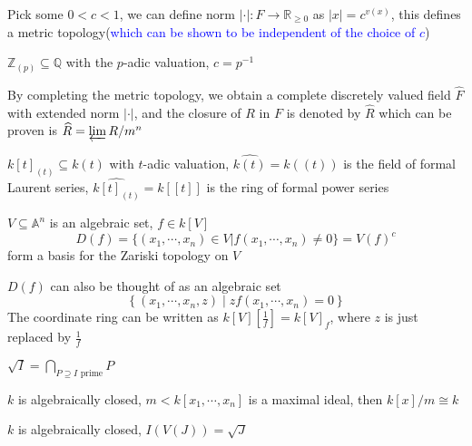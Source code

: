\documentclass[main]{subfiles}
\begin{document}
\begin{definition}
Pick some $0<c<1$, we can define norm $|\cdot|:F\to\mathbb R_{\geq0}$ as $|x|=c^{v(x)}$, this defines a metric topology(\textcolor{blue}{which can be shown to be independent of the choice of $c$})
\end{definition}

\begin{example}
$\mathbb Z_{(p)}\subseteq \mathbb Q$ with the $p$-adic valuation, $c=p^{-1}$
\end{example}

\begin{definition}
By completing the metric topology, we obtain a complete discretely valued field $\widehat F$ with extended norm $|\cdot|$, and the closure of $R$ in $F$ is denoted by $\widehat R$ which can be proven is $\widehat R=\varprojlim R/m^n$
\end{definition}

\begin{example}
$k[t]_{(t)}\subseteq k(t)$ with $t$-adic valuation, $\widehat{k(t)}=k((t))$ is the field of formal Laurent series, $\widehat{k[t]_{(t)}}=k[[t]]$ is the ring of formal power series
\end{example}

\begin{definition}
$V\subseteq\mathbb A^n$ is an algebraic set, $f\in k[V]$
\[D(f)=\{(x_1,\cdots,x_n)\in V|f(x_1,\cdots,x_n)\neq0\}=V(f)^c\]
form a basis for the Zariski topology on $V$ \par
$D(f)$ can also be thought of as an algebraic set
\[\left\{(x_1,\cdots,x_n,z)\middle|zf(x_1,\cdots,x_n)=0\right\}\]
The coordinate ring can be written as $k[V][\frac{1}{f}]=k[V]_f$, where $z$ is just replaced by $\frac{1}{f}$
\end{definition}

\begin{theorem}
$\displaystyle \sqrt{I}=\bigcap_{P\supseteq I \text{ prime}}P$
\end{theorem}

\begin{theorem}\label{Hilbert Nullstellensatz weak form}
$k$ is algebraically closed, $m<k[x_1,\cdots,x_n]$ is a maximal ideal, then $k[x]/m\cong k$
\end{theorem}

\begin{theorem}
$k$ is algebraically closed, $I(V(J))=\sqrt J$
\end{theorem}
\end{document}
